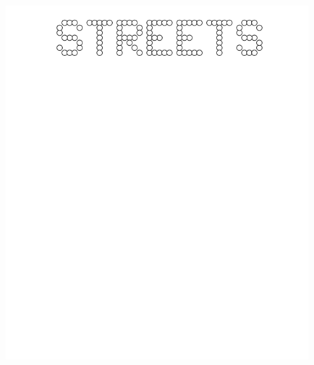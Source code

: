 \documentclass[17pt]{extreport}
\begin{document}
	
	 \begin{figure}
		\centering
		\includegraphics[width=6.25in]{imageserver/uploadimages/streets.png}
	\end{figure}
	
\end{document}
